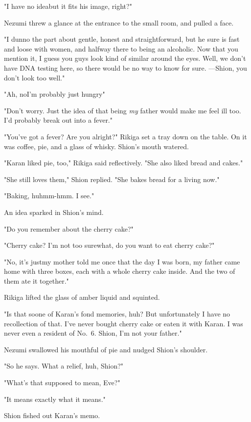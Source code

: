 "I have no idea\el but it fits his image, right?"

Nezumi threw a glance at the entrance to the small room, and pulled a
face.

"I dunno the part about gentle, honest and straightforward, but he sure
is fast and loose with women, and halfway there to being an alcoholic.
Now that you mention it, I guess you guys look kind of similar around
the eyes. Well, we don't have DNA testing here, so there would be no way
to know for sure. ---Shion, you don't look too well."

"Ah, no\el I'm probably just hungry\el "

"Don't worry. Just the idea of that being \emph{my} father would make me feel
ill too. I'd probably break out into a fever."

"You've got a fever? Are you alright?" Rikiga set a tray down on the
table. On it was coffee, pie, and a glass of whisky. Shion's mouth
watered.

"Karan liked pie, too," Rikiga said reflectively. "She also liked bread
and cakes."

"She still loves them," Shion replied. "She bakes bread for a living
now."

"Baking, huh\el mm-hmm. I see."

An idea sparked in Shion's mind.

"Do you remember about the cherry cake?"

"Cherry cake? I'm not too sure\el what, do you want to eat cherry cake?"

"No, it's just\el my mother told me once that the day I was born, my
father came home with three boxes, each with a whole cherry cake inside.
And the two of them ate it together."

Rikiga lifted the glass of amber liquid and squinted.

"Is that so\el one of Karan's fond memories, huh? But unfortunately I
have no recollection of that. I've never bought cherry cake or eaten it
with Karan. I was never even a resident of No.~6. Shion, I'm not your
father."

Nezumi swallowed his mouthful of pie and nudged Shion's shoulder.

"So he says. What a relief, huh, Shion?"

"What's that supposed to mean, Eve?"

"It means exactly what it means."

Shion fished out Karan's memo.



